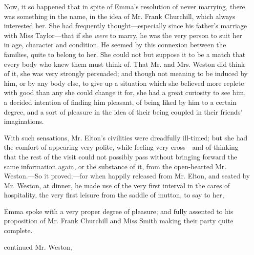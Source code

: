 Now, it so happened that in spite of Emma's resolution of never marrying, there was something in the name, in the idea of Mr. Frank Churchill, which always interested her. She had frequently thought---especially since his father's marriage with Miss Taylor---that if she {\em were} to marry, he was the very person to suit her in age, character and condition. He seemed by this connexion between the families, quite to belong to her. She could not but suppose it to be a match that every body who knew them must think of. That Mr. and Mrs. Weston did think of it, she was very strongly persuaded; and though not meaning to be induced by him, or by any body else, to give up a situation which she believed more replete with good than any she could change it for, she had a great curiosity to see him, a decided intention of finding him pleasant, of being liked by him to a certain degree, and a sort of pleasure in the idea of their being coupled in their friends' imaginations.

With such sensations, Mr. Elton's civilities were dreadfully ill-timed; but she had the comfort of appearing very polite, while feeling very cross---and of thinking that the rest of the visit could not possibly pass without bringing forward the same information again, or the substance of it, from the open-hearted Mr. Weston.---So it proved;---for when happily released from Mr. Elton, and seated by Mr. Weston, at dinner, he made use of the very first interval in the cares of hospitality, the very first leisure from the saddle of mutton, to say to her,


Emma spoke with a very proper degree of pleasure; and fully assented to his proposition of Mr. Frank Churchill and Miss Smith making their party quite complete.

 continued Mr. Weston, 

